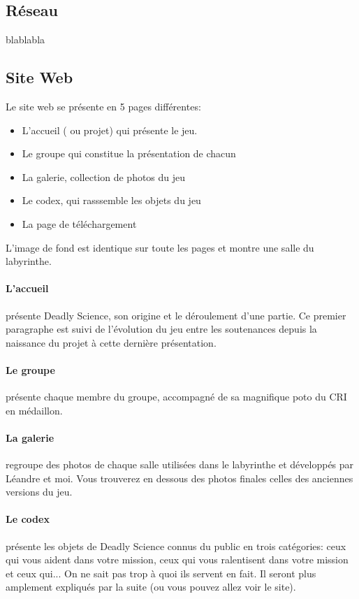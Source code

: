 \documentclass{article}
\begin{document}

\subsection{Réseau}
blablabla
\subsection{Site Web}
Le site web se présente en 5 pages différentes:
\begin{itemize}
	\item{} L'accueil ( ou projet) qui présente le jeu.
	\item{} Le groupe qui constitue la présentation de chacun
	\item{} La galerie, collection de photos du jeu
	\item{} Le codex, qui rasssemble les objets du jeu
	\item{} La page de téléchargement
\end{itemize}
L'image de fond est identique sur toute les pages et montre une salle du labyrinthe.

\paragraph{L'accueil}présente Deadly Science, son origine et le déroulement d'une partie. Ce premier paragraphe est suivi de l'évolution du jeu entre les soutenances depuis la naissance du projet à cette dernière présentation.

\paragraph{Le groupe}présente chaque membre du groupe, accompagné de sa magnifique poto du CRI en médaillon.

\paragraph{La galerie}regroupe des photos de chaque salle utilisées dans le labyrinthe et développés par Léandre et moi. Vous trouverez en dessous des photos finales celles des anciennes versions du jeu.

\paragraph{Le codex}présente les objets de Deadly Science connus du public en trois catégories: ceux qui vous aident dans votre mission, ceux qui vous ralentisent dans votre mission et ceux qui... On ne sait pas trop à quoi ils servent en fait. Il seront plus amplement expliqués par la suite (ou vous pouvez allez voir le site).
\end{document}
